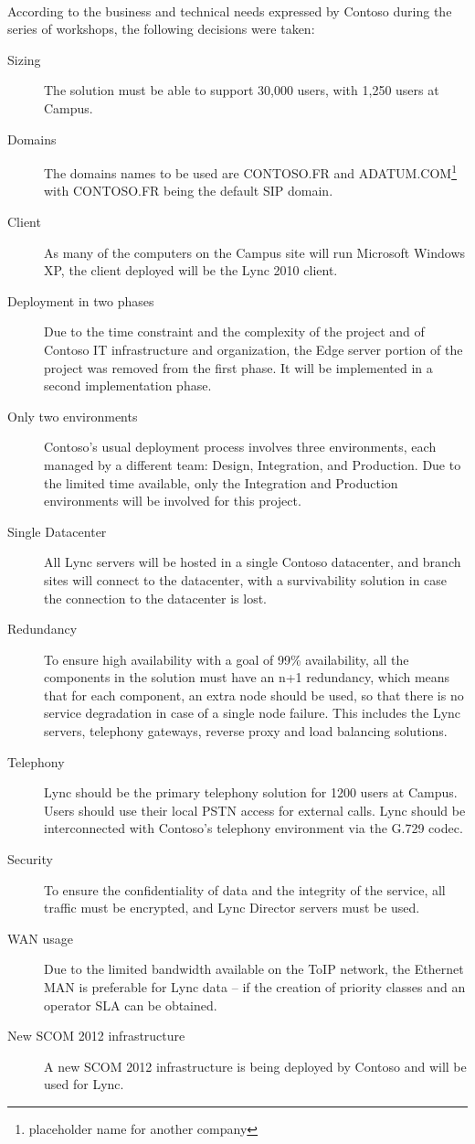 	\paragraph{}
		According to the business and technical needs expressed by Contoso during the series of workshops, the following decisions were taken:
		\begin{description}
			\item[Sizing] The solution must be able to support 30,000 users, with 1,250 users at Campus.
			\item[Domains] The domains names to be used are CONTOSO.FR and ADATUM.COM\footnote{placeholder name for another company} with CONTOSO.FR being the default SIP domain.
			\item[Client] As many of the computers on the Campus site will run Microsoft Windows XP, the client deployed will be the Lync 2010 client.
			\item[Deployment in two phases] Due to the time constraint and the complexity of the project and of Contoso IT infrastructure and organization, the Edge server portion of the project was removed from the first phase. It will be implemented in a second implementation phase.
			\item[Only two environments] Contoso's usual deployment process involves three environments, each managed by a different team: Design, Integration, and Production. Due to the limited time available, only the Integration and Production environments will be involved for this project.
			\item[Single Datacenter] All Lync servers will be hosted in a single Contoso datacenter, and branch sites will connect to the datacenter, with a survivability solution in case the connection to the datacenter is lost.
			\item[Redundancy] To ensure high availability with a goal of 99\% availability, all the components in the solution must have an n+1 redundancy, which means that for each component, an extra node should be used, so that there is no service degradation in case of a single node failure. This includes the Lync servers, telephony gateways, reverse proxy and load balancing solutions.
			\item[Telephony] Lync should be the primary telephony solution for 1200 users at Campus. Users should use their local PSTN access for external calls. Lync should be interconnected with Contoso's telephony environment via the G.729 codec.
			\item[Security] To ensure the confidentiality of data and the integrity of the service, all traffic must be encrypted, and Lync Director servers must be used.
			\item[WAN usage] Due to the limited bandwidth available on the ToIP network, the Ethernet MAN is preferable for Lync data -- if the creation of priority classes and an operator SLA can be obtained.
			\item[New SCOM 2012 infrastructure] A new SCOM 2012 infrastructure is being deployed by Contoso and will be used for Lync.
		\end{description}


